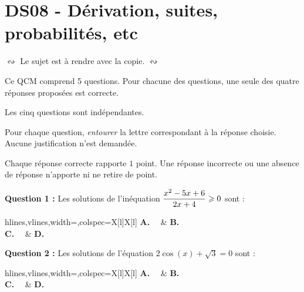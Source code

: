 \documentclass[a4paper,11pt]{article}
\begin{document}
\part{DS08 - Dérivation, suites, probabilités, etc}

\smallskip

\nomprenomtcbox

\begin{marker}$\leftrightsquigarrow$ Le sujet est à rendre avec la copie. $\leftrightsquigarrow$\end{marker}

\smallskip


\medskip

Ce QCM comprend 5 questions. Pour chacune des questions, une seule des quatre réponses proposées est correcte.

Les cinq questions sont indépendantes.

Pour chaque question, \textit{entourer} la lettre correspondant à la réponse choisie. Aucune justification n'est demandée.

Chaque réponse correcte rapporte $1$ point. Une réponse incorrecte ou une absence de réponse n'apporte ni ne retire de point.

\medskip

\textbf{\red Question 1 :} Les solutions de l'inéquation $\dfrac{x^2-5x+6}{2x+4} \geqslant 0$ sont :

\medskip

\begin{tblr}{hlines,vlines,width=\linewidth,colspec={X[l]X[l]}}
	\textbf{A.}~~ & \textbf{B.}~~ \\
	\textbf{C.}~~ & \textbf{D.}~~ \\
\end{tblr}

\bigskip

\textbf{\red Question 2 :} Les solutions de l'équation $2\cos(x)+\sqrt{3}=0$ sont :

\medskip

\begin{tblr}{hlines,vlines,width=\linewidth,colspec={X[l]X[l]}}
	\textbf{A.}~~ & \textbf{B.}~~ \\
	\textbf{C.}~~ & \textbf{D.}~~ \\
\end{tblr}
\end{document}
